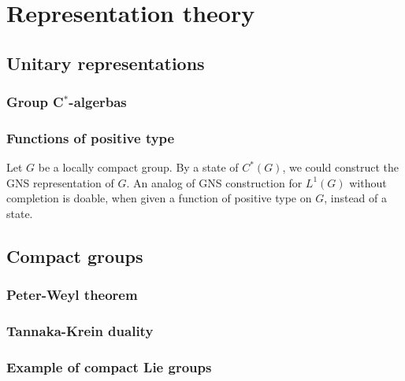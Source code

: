 \documentclass{../../large}
\begin{document}
\part{Representation theory}
\chapter{Unitary representations}
\section{}
\begin{prb}
\end{prb}
\section{Group C$^*$-algerbas}
\begin{prb}
\end{prb}
\section{Functions of positive type}
\begin{prb}
\end{prb}
\begin{prb}
\end{prb}
\begin{prb}
Let $G$ be a locally compact group.
By a state of $C^*(G)$, we could construct the GNS representation of $G$.
An analog of GNS construction for $L^1(G)$ without completion is doable, when given a function of positive type on $G$, instead of a state.
\end{prb}


\chapter{Compact groups}
\section{Peter-Weyl theorem}
\section{Tannaka-Krein duality}
\section{Example of compact Lie groups}
\end{document}
